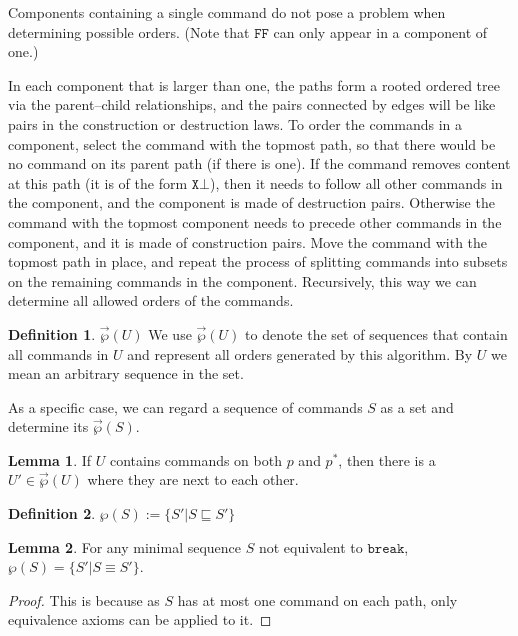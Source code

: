 \documentclass[12pt]{article}
\newcommand{\empt}{\bot}
\newcommand{\pp}{p^*} %
\newcommand{\cbrk}{\mathtt{break}}
\newcommand{\fscommand}[2]{{#1#2}}
\newcommand{\fsregcommandchar}[1]{\mathtt{#1}}
\newcommand{\fsregcommand}[2]{\fscommand{\fsregcommandchar{#1}}{\fsregcommandchar{#2}}}
\newcommand{\cff}{\fsregcommand{F}{F}}
\newcommand{\eqext}{\sqsubseteq}
\newcommand{\extset}[1]{\wp({#1})}
\newcommand{\orderset}[1]{\vec{\wp}({#1})}
\newcommand{\ordered}[1]{#1}
\theoremstyle{definition}
\newtheorem{mydef}{Definition}
\newtheorem{mylem}{Lemma}
\begin{document}
Components containing a single command do not pose a problem when determining
possible orders.
(Note that $\cff$ can only appear in a component of one.)

In each component that is larger than one, the paths 
form a rooted ordered tree via the parent--child relationships,
and the pairs connected by edges will be like pairs in the
construction or destruction laws.
To order the commands in a component,
select the command with the topmost path, so that there would be no command
on its parent path (if there is one). 
If the command removes content at this path (it is of the form $\fsregcommand{X}{\empt}$), then it
needs to follow all other commands in the component, and
the component is made of destruction pairs.
Otherwise the command with the topmost component needs to precede other commands
in the component, and it is made of construction pairs.
Move the command with the topmost path in place, and
repeat the process of splitting commands into subsets on the remaining commands
in the component. Recursively, this way we can determine all allowed orders of the commands.

\begin{mydef}{$\orderset{U}$}
We use $\orderset{U}$ to denote the set of sequences that contain all commands in $U$
and represent all orders generated by this algorithm.
By $\ordered{U}$ we mean an arbitrary sequence in the set.
\end{mydef}

As a specific case, we can regard a sequence of commands $S$
as a set and determine its $\orderset{S}$.

\begin{mylem}\label{lemma:neighbour}
If $U$ contains commands on both $p$ and $\pp$, then
there is a $U'\in\orderset{U}$ where they are next to each other.
\end{mylem}

\begin{mydef}
$\extset{S} := \{S'|S\eqext S'\}$
\end{mydef}

\begin{mylem}\label{lemma:minextset}
For any minimal sequence $S$ not equivalent to $\cbrk$, $\extset{S} = \{S'|S\equiv S'\}$.
\end{mylem}
\begin{proof}
This is because as $S$ has at most one command on each path, only equivalence axioms
can be applied to it.
\end{proof}
\end{document}
